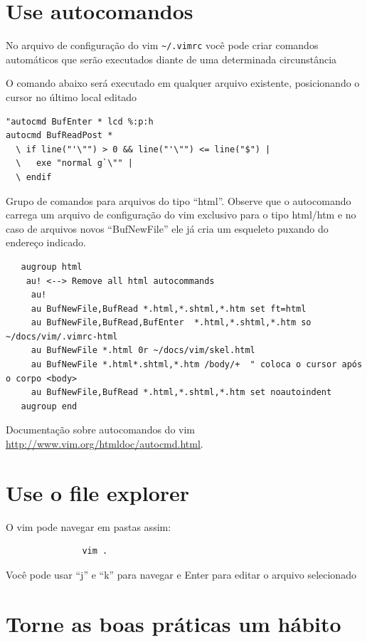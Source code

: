 \documentclass[10pt,a4paper,openany]{book}
\begin{document}
\section{Use autocomandos }
\label{Use autocomandos }

No arquivo de configuração do vim \verb|~/.vimrc| você pode criar comandos
automáticos que serão executados diante de uma determinada
circunstância

O comando abaixo será executado em qualquer arquivo existente, posicionando o cursor no último local editado

\begin{verbatim}
"autocmd BufEnter * lcd %:p:h
autocmd BufReadPost *
  \ if line("'\"") > 0 && line("'\"") <= line("$") |
  \   exe "normal g`\"" |
  \ endif
\end{verbatim}


Grupo de comandos para arquivos do tipo ``html''. Observe que o
autocomando carrega um arquivo de configuração do vim exclusivo para o
tipo html/htm e no caso de arquivos novos ``BufNewFile'' ele já cria um
esqueleto puxando do endereço indicado.

\begin{verbatim}
   augroup html
    au! <--> Remove all html autocommands
     au!
     au BufNewFile,BufRead *.html,*.shtml,*.htm set ft=html
     au BufNewFile,BufRead,BufEnter  *.html,*.shtml,*.htm so ~/docs/vim/.vimrc-html
     au BufNewFile *.html 0r ~/docs/vim/skel.html
     au BufNewFile *.html*.shtml,*.htm /body/+  " coloca o cursor após o corpo <body>
     au BufNewFile,BufRead *.html,*.shtml,*.htm set noautoindent
   augroup end
\end{verbatim}

Documentação sobre autocomandos do vim \url{http://www.vim.org/htmldoc/autocmd.html}.

\section{Use o file explorer}\label{Use o file explorer}

O vim pode navegar em pastas assim:

\begin{verbatim}
			   vim .
\end{verbatim}

Você pode usar ``j'' e ``k'' para navegar e Enter para editar o arquivo selecionado

\section{Torne as boas práticas um hábito }\label{Torne as boas práticas um hábito }
\end{document}
